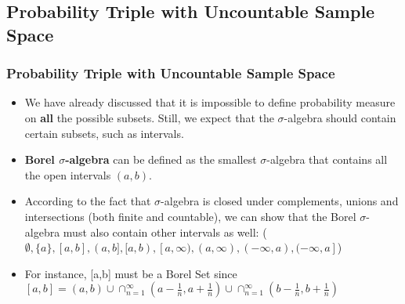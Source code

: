 \documentclass[handout]{beamer}
\begin{document}
\subsection{Probability Triple with Uncountable Sample Space}
\frame
{
  \frametitle{Probability Triple with Uncountable Sample Space}

   \begin{itemize}

      
            \item<1-> We have already discussed that it is impossible to define probability measure on {\bf all} the possible subsets. Still, we expect that the $\sigma$-algebra should contain certain subsets, such as intervals. 
            
               \item<2-> \textbf{Borel $\sigma$-algebra} can be defined as the smallest $\sigma$-algebra that contains all the open intervals $(a,b)$.  
               
                \item<3-> According to the fact that $\sigma$-algebra is closed under complements, unions and intersections (both finite and countable), we can show that the Borel $\sigma$-algebra must also contain other intervals as well: ($\emptyset, \{a\}, [a,b], (a,b], [a,b), [a,\infty), (a,\infty),  (-\infty,a), (-\infty,a] $)
               
                             \item<4-> For instance, [a,b] must be a Borel Set since $[a,b]=(a,b) \cup \cap_{n=1}^\infty (a-\frac{1}{n}, a+\frac{1}{n} ) \cup \cap_{n=1}^\infty (b-\frac{1}{n}, b+\frac{1}{n} )$                                               \end{itemize}
}
\end{document}
